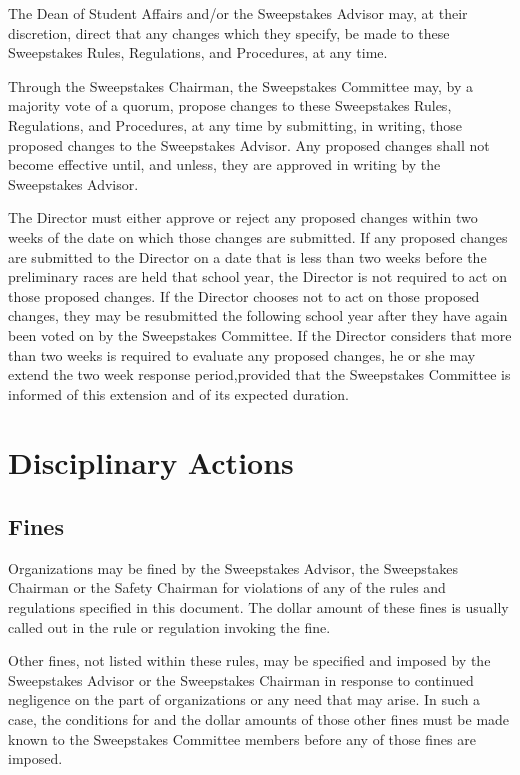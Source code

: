 	The Dean of Student Affairs and/or the Sweepstakes Advisor may, at their
	discretion, direct that any changes which they specify, be made to these
	Sweepstakes Rules, Regulations, and Procedures, at any time.

	Through the Sweepstakes Chairman, the Sweepstakes Committee may, by a majority
	vote of a quorum, propose changes to these Sweepstakes Rules, Regulations, and
	Procedures, at any time by submitting, in writing, those proposed changes to
	the Sweepstakes Advisor. Any proposed changes shall not become effective until,
	and unless, they are approved in writing by the Sweepstakes Advisor.

	The Director must either approve or reject any proposed changes within two
	weeks of the date on which those changes are submitted. If any proposed changes
	are submitted to the Director on a date that is less than two weeks before the
	preliminary races are held that school year, the Director is not required to
	act on those proposed changes. If the Director chooses not to act on those
	proposed changes, they may be resubmitted the following school year after they
	have again been voted on by the Sweepstakes Committee. If the Director
	considers that more than two weeks is required to evaluate any proposed
	changes, he or she may extend the two week response period,provided that the
	Sweepstakes Committee is informed of this extension and of its expected
	duration.

\section{Disciplinary Actions}

\subsection{Fines}

	Organizations may be fined by the Sweepstakes Advisor, the Sweepstakes Chairman
	or the Safety Chairman for violations of any of the rules and regulations
	specified in this document. The dollar amount of these fines is usually called
	out in the rule or regulation invoking the fine.

	Other fines, not listed within these rules, may be specified and imposed by the
	Sweepstakes Advisor or the Sweepstakes Chairman in response to continued
	negligence on the part of organizations or any need that may arise. In such a
	case, the conditions for and the dollar amounts of those other fines must be
	made known to the Sweepstakes Committee members before any of those fines are
	imposed.

